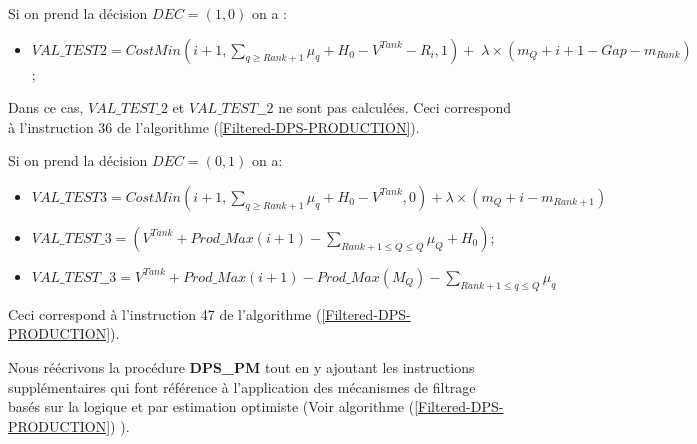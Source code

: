 Si on prend la décision $DEC=(1,0)$ on a :
\begin{itemize}[label=$\square$]
	\item $VAL\_TEST2= CostMin(i+1, \sum_{q \geq Rank +1} \mu_q + H_0 - V^{Tank} - R_i, 1) +\lambda \times(m_Q + i +1 - Gap - m_{Rank} )$ ;
\end{itemize}
Dans ce cas, $VAL\_TEST\_2$ et $VAL\_TEST\_\_2$ ne sont pas calculées. Ceci correspond à l'instruction 36 de l'algorithme (\ref{Filtered-DPS-PRODUCTION}).

Si on prend la décision $DEC=(0,1)$ on a:
\begin{itemize}[label=$\square$]
	\item $VAL\_TEST3 = CostMin(i+1, \sum_{q \geq Rank +1}\mu_q + H_0 - V^{Tank}, 0) +\lambda \times (m_Q + i-m_{Rank+1})$ 
	
	\item $VAL\_TEST\_3=(V^{Tank} + Prod\_Max(i+1)  - \sum_{ Rank+1 \leq Q \leq Q} \mu_Q + H_0);$
	\item $VAL\_TEST\_\_3=V^{Tank} + Prod\_Max(i+1)- Prod\_Max(M_Q) - \sum_{ Rank+1 \leq q \leq Q} \mu_q$
\end{itemize}
Ceci correspond à l'instruction 47 de l'algorithme (\ref{Filtered-DPS-PRODUCTION}).

Nous réécrivons la procédure \textbf{DPS\_PM} tout en y ajoutant les instructions supplémentaires qui font référence à l'application des mécanismes de filtrage basés sur la logique et par estimation optimiste (Voir algorithme (\ref{Filtered-DPS-PRODUCTION}) ).

